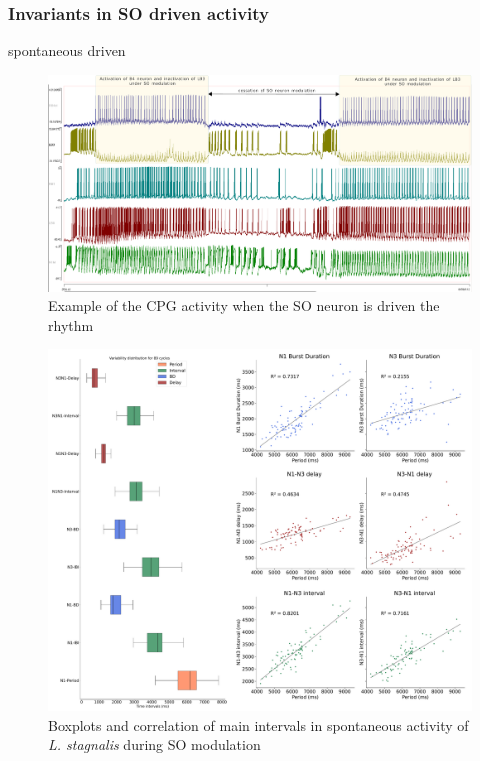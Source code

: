 \subsubsection{Invariants in SO driven activity}
\large{spontaneous driven}
 
 	
 	
\begin{figure}[bth!]
	\centering
	\includegraphics[width=\textwidth]{img/invariants/SO-spontaneuous-driven.pdf}
	\caption{Example of the CPG activity when the SO neuron is driven the rhythm}
	\label{fig:SO-spontaneuous-driven}
\end{figure}




\begin{figure}[bth!]
	\centering
	\includegraphics[width=\textwidth]{img/invariants/prep4_so_driven_2 intervals panel.pdf}
	\caption{Boxplots and correlation of main intervals in spontaneous activity of \textit{L. stagnalis} during SO modulation}
	\label{fig:prep4 so driven invariants}
\end{figure}
 	
